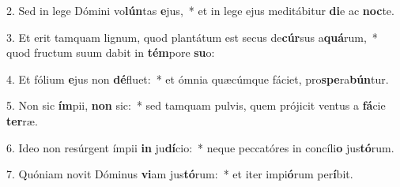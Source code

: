 2. Sed in lege Dómini vo\textbf{lún}tas \textbf{e}jus,~*  et in lege ejus meditábitur \textbf{di}e ac \textbf{noc}te.\

3. Et erit tamquam lignum, quod plantátum est secus de\textbf{cúr}sus a\textbf{quá}rum,~*  quod fructum suum dabit in \textbf{tém}pore \textbf{su}o:\

4. Et fólium \textbf{e}jus non \textbf{dé}fluet:~*  et ómnia quæcúmque fáciet, pro\textbf{spe}ra\textbf{bún}tur.\

5. Non sic \textbf{ím}pii, \textbf{non} sic:~*  sed tamquam pulvis, quem prójicit ventus a \textbf{fá}cie \textbf{ter}ræ.\

6. Ideo non resúrgent ímpii \textbf{in} ju\textbf{dí}cio:~*  neque peccatóres in concíli\textbf{o} jus\textbf{tó}rum.\

7. Quóniam novit Dóminus \textbf{vi}am jus\textbf{tó}rum:~*  et iter impi\textbf{ó}rum per\textbf{í}bit.\

